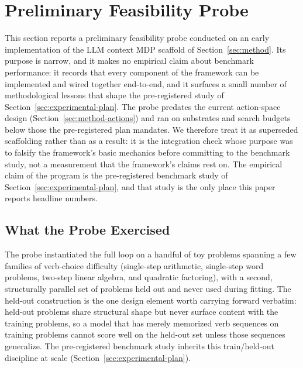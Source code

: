 \section{Preliminary Feasibility Probe}
\label{sec:pilot}


This section reports a preliminary feasibility probe conducted on an early
implementation of the LLM context MDP scaffold of
Section~\ref{sec:method}. Its purpose is narrow, and it makes no empirical
claim about benchmark performance: it records that every component of the
framework can be implemented and wired together end-to-end, and it surfaces a
small number of methodological lessons that shape the pre-registered study of
Section~\ref{sec:experimental-plan}. The probe predates the current
action-space design (Section~\ref{sec:method-actions}) and ran on substrates
and search budgets below those the pre-registered plan mandates. We therefore
treat it as superseded scaffolding rather than as a result: it is the
integration check whose purpose was to falsify the framework's basic mechanics
before committing to the benchmark study, not a measurement that the framework's
claims rest on. The empirical claim of the program is the pre-registered
benchmark study of Section~\ref{sec:experimental-plan}, and that study is the
only place this paper reports headline numbers.

\subsection{What the Probe Exercised}
\label{sec:pilot-setup}

The probe instantiated the full loop on a handful of toy problems spanning a few
families of verb-choice difficulty (single-step arithmetic, single-step word
problems, two-step linear algebra, and quadratic factoring), with a second,
structurally parallel set of problems held out and never used during fitting.
The held-out construction is the one design element worth carrying forward
verbatim: held-out problems share structural shape but never surface content
with the training problems, so a model that has merely memorized verb sequences
on training problems cannot score well on the held-out set unless those
sequences generalize. The pre-registered benchmark study inherits this
train/held-out discipline at scale (Section~\ref{sec:experimental-plan}).

